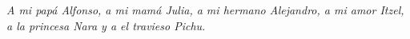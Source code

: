 \pagestyle{empty}
\begin{center}
	\vspace*{\fill}
	\textit{A mi papá Alfonso, a mi mamá Julia, a mi hermano Alejandro, a mi amor Itzel, a la princesa Nara y a el travieso Pichu.}
	\vspace*{\fill}
\end{center}